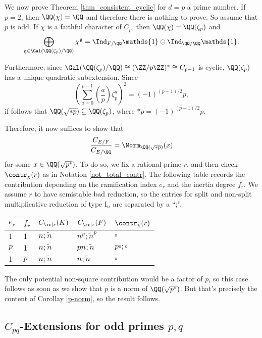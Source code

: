 
We now prove Theorem \ref*{thm_consistent_cyclic} for $d=p$ a prime number. If $p=2$, then $\QQ(\chi)=\QQ$ and therefore there is nothing to prove. So assume that $p$ is odd. If $\chi$ is a faithful character of $C_p$, then $\QQ(\chi)=\QQ(\zeta_p)$ and 
$$\bigoplus_{\mathfrak{g}\in\Gal(\QQ(\zeta_p)/\QQ)}\chi^{\mathfrak{g}}=\Ind_{F/\QQ}\mathds{1}\ominus\Ind_{\QQ/\QQ}\mathds{1}.$$

Furthermore, since $\Gal(\QQ(\zeta_p)/\QQ)\cong(\ZZ/p\ZZ)^*\cong C_{p-1}$ is cyclic, $\QQ(\zeta_p)$ has a unique quadratic subextension. Since 
$$\left(\sum_{a=0}^{p-1}\left(\frac{a}{p}\right)\zeta_p^a\right)^2=(-1)^{(p-1)/2}p,$$
if follows that $\QQ(\sqrt{*p})\subseteq\QQ(\zeta_p)$, where $*p=(-1)^{(p-1)/2}p$.

Therefore, it now suffices to show that 
$$\frac{C_{E/F}}{C_{E/\QQ}}=\Norm_{\QQ(\sqrt{*p})}(x)$$
for some $x\in\QQ(\sqrt{p^*})$. To do so, we fix a rational prime $r$, and then check $\contr_\chi(r)$ as in Notation \ref*{not_total_contr}. The following table records the contribution depending on the ramification index $e_r$ and the inertia degree $f_r$. We assume $r$ to have semistable bad reduction, so the entries for split and non-split multiplicative reduction of type $\mathrm{I}_n$ are separated by a ``;''.

\begin{table}[h!]
    \centering
    \begin{tabular}{|l|l|l|l|l|}
    \hline
    $e_r$ & $f_r$  & $C_{\rr\mid r}(K)$ & $C_{\rr\mid r}(F)$  & $\contr_\chi(r)$ \\ \hline
    $1$ & $1$ & $n;\tilde{n}$ & $n^p;\tilde{n}^p$ & $\square$ \\ \hline
    $p$ & $1$ & $n;\tilde{n}$ & $pn;\tilde{n}$ & $p\square;\square$ \\ \hline
    $1$ & $p$ & $n;\tilde{n}$ & $n;\tilde{n}$ & $\square$ \\ \hline
    \end{tabular}
\end{table}

The only potential non-square contribution would be a factor of $p$, so this case follows as soon as we show that $p$ is a norm of $\QQ(\sqrt{p^*})$. But that's precisely the content of Corollay \ref*{p-norm}, so the result follows.

\subsection*{\texorpdfstring{$C_{pq}$}{TEXT}-Extensions for odd primes \texorpdfstring{$p,q$}{TEXT}} \label{case_Cpq}


